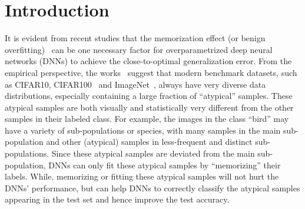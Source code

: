 \vspace{-0.3cm}
\section{Introduction}
It is evident from recent studies that the memorization effect (or benign overfitting)~\cite{feldman2020does, feldman2020neural, bartlett2020benign, chatterji2020finite, muthukumar2020harmless} can be one necessary factor for overparametrized deep neural networks (DNNs) to achieve the close-to-optimal generalization error. From the empirical perspective, the works~\cite{feldman2020does, feldman2020neural} suggest that modern benchmark datasets, such as CIFAR10, CIFAR100~\cite{krizhevsky2009learning} and  ImageNet~\cite{krizhevsky2012imagenet}, always have very diverse data distributions, especially containing a large fraction of ``atypical'' samples. These atypical samples are both visually and statistically very different from the other samples in their labeled class. For example, the images in the class ``bird'' may have a variety of sub-populations or species, with many samples in the main sub-population and other (atypical) samples in less-frequent and distinct sub-populations. Since these atypical samples are deviated from the main sub-population, DNNs can only fit these atypical samples by ``memorizing'' their labels. While, memorizing or fitting these atypical samples will not hurt the DNNs' performance, but can help DNNs to correctly classify the atypical samples appearing in the test set and hence improve the test accuracy.





